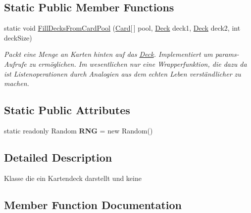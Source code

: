 \subsection*{Static Public Member Functions}
\begin{DoxyCompactItemize}
\item 
static void \mbox{\hyperlink{class_poke_quet_1_1_deck_a12d9b5d3adc4c8c129f04ad024000a0c}{Fill\+Decks\+From\+Card\+Pool}} (\mbox{\hyperlink{class_poke_quet_1_1_card}{Card}}\mbox{[}$\,$\mbox{]} pool, \mbox{\hyperlink{class_poke_quet_1_1_deck}{Deck}} deck1, \mbox{\hyperlink{class_poke_quet_1_1_deck}{Deck}} deck2, int deck\+Size)
\begin{DoxyCompactList}\small\item\em Packt eine Menge an Karten hinten auf das \mbox{\hyperlink{class_poke_quet_1_1_deck}{Deck}}. Implementiert um params-\/\+Aufrufe zu ermöglichen. Im wesentlichen nur eine Wrapperfunktion, die dazu da ist Listenoperationen durch Analogien aus dem echten Leben verständlicher zu machen. \end{DoxyCompactList}\end{DoxyCompactItemize}
\subsection*{Static Public Attributes}
\begin{DoxyCompactItemize}
\item 
\mbox{\label{class_poke_quet_1_1_deck_a3a9710bea0016f80f89e0160717b457f}} 
static readonly Random {\bfseries R\+NG} = new Random()
\end{DoxyCompactItemize}


\subsection{Detailed Description}
Klasse die ein Kartendeck darstellt und keine 



\subsection{Member Function Documentation}
\mbox{\label{class_poke_quet_1_1_deck_a12d9b5d3adc4c8c129f04ad024000a0c}} 
